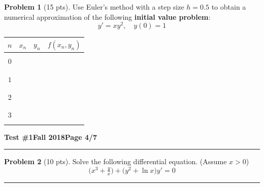 \documentclass[12pt]{article}
\theoremstyle{definition}
\newtheorem{problem}{Problem}
\begin{document}
\begin{problem}[15 pts]
  Use Euler's method with a step size $h=0.5$ to obtain a numerical approximation of the following \textbf{initial value problem}:
  \begin{equation*}
    y' = xy^2, \quad y(0)=1
  \end{equation*}
  \vspace{5cm}
  \begin{flushright}
    \begin{tabular}{|c||c|c|c|}
      \hline
      $n$ & $x_n$ & $y_n$ & $f(x_n, y_n)$ \\ 
      \hline \hline
          &&& \\
      $0$ & \hspace{0.5cm} & \hspace{1cm} & \hspace{3cm} \\
          &&& \\ \hline
          &&& \\
      $1$ &&& \\
          &&& \\ \hline
          &&& \\
      $2$ &&& \\
          &&& \\ \hline
          &&& \\      
      $3$ &&& \\
          &&& \\ \hline      
    \end{tabular}
  \end{flushright}
\end{problem}
\newpage

\hfill{\large\bf Test \#1}\hfill{\large\bf Fall 2018}\hfill{\large\bf Page 4/7}\hrule

\bigskip

\begin{problem}[10 pts]
  Solve the following differential equation.  (Assume $x>0$)
  \begin{equation*}
    \big( x^3 + \tfrac{y}{x} \big) + \big( y^2 + \ln x \big) y' = 0
  \end{equation*}

  \vspace{6.5cm}
  \begin{flushright}
  \end{flushright}
\end{problem}
\hrule
\end{document}

